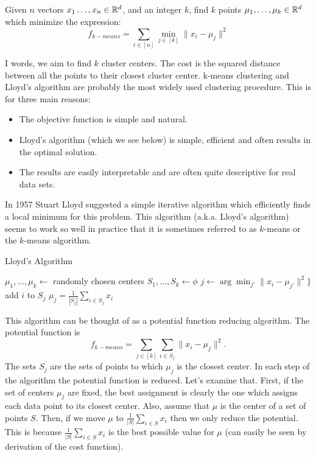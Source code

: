 



\begin{definition}[$k$-means]
Given $n$ vectors $x_1\ldots,x_n\in {\mathbb{R}}^d$, and an integer $k$, find $k$ points $\mu_1,\ldots,\mu_k \in {\mathbb{R}}^d$
which minimize the expression:
\[
f_{k-means} = \sum_{i \in [n]} \min_{j \in [k]} \|x_i - \mu_j \|^2
\]
\end{definition}
I words, we aim to find $k$ cluster centers. The cost is the squared distance between all the points to their closest cluster center.
k-means clustering and Lloyd's algorithm \cite{Lloyd82leastsquares} are probably the most widely used clustering procedure.
This is for three main reasons:
\begin{itemize} 
\item The objective function is simple and natural.
\item Lloyd's algorithm (which we see below) is simple, efficient and often results in the optimal solution.  
\item The results are easily interpretable and are often quite descriptive for real data sets. 
\end{itemize}
In 1957 Stuart Lloyd suggested a simple iterative algorithm which efficiently finds a local minimum for this problem.
This algorithm (a.k.a. Lloyd's algorithm) seems to work so well in practice that it is sometimes referred to as $k$-means or the $k$-means algorithm.

\begin{algorithm}
\caption{Lloyd's Algorithm}
\begin{algorithmic}
\STATE $\mu_1,\ldots,\mu_k \leftarrow$ randomly chosen centers
\STATE $S_1,\ldots,S_k \leftarrow \phi$
	\STATE $j \leftarrow \arg\min_{j'}\|x_i - \mu_{j'}\|^2 \}$
	\STATE add $i$ to $S_j$
\ENDFOR
{}
	\STATE $\mu_j = \frac{1}{|S_j|}\sum_{i \in S_j} x_i$
\ENDFOR
\ENDWHILE
\end{algorithmic}
\end{algorithm}
This algorithm can be thought of as a potential function reducing algorithm.
The potential function is 
\[
f_{k-means} = \sum_{j \in [k]} \sum_{i \in S_j} \|x_i - \mu_j\|^2.
\]
The sets $S_j$ are the sets of points to which $\mu_j$ is the closest center.
In each step of the algorithm the potential function is reduced.
Let's examine that.
First, if the set of centers $\mu_j$ are fixed, the best assignment is clearly the one which assigns
each data point to its closest center. Also, assume that $\mu$ is the center of a set of points $S$.
Then, if we move $\mu$ to $\frac{1}{|S|}\sum_{i \in S} x_i$ then we only reduce the potential.
This is because $\frac{1}{|S|}\sum_{i \in S} x_i$ is the best possible value for $\mu$ (can easily be seen by derivation of the cost function).

